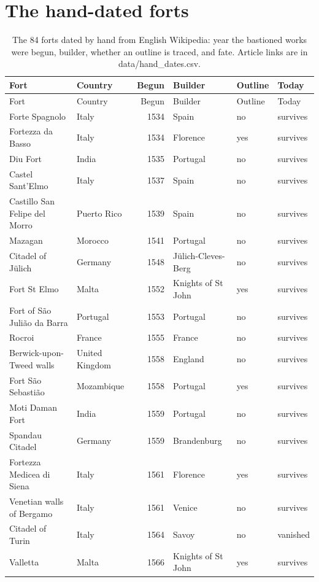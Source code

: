 \documentclass[11pt,a4paper]{article}
\begin{document}
\section{The hand-dated forts}
{\footnotesize\setlength{\tabcolsep}{4pt}\begin{longtable}{p{4.6cm}p{3.2cm}rp{3.2cm}ll}\caption{The 84 forts dated by hand from English Wikipedia: year the bastioned works were begun, builder, whether an outline is traced, and fate. Article links are in data/hand\_dates.csv.}\label{tab:hand}\\\toprule Fort & Country & Begun & Builder & Outline & Today\\\midrule\endfirsthead\toprule Fort & Country & Begun & Builder & Outline & Today\\\midrule\endhead
Forte Spagnolo & Italy & 1534 & Spain & no & survives\\
Fortezza da Basso & Italy & 1534 & Florence & yes & survives\\
Diu Fort & India & 1535 & Portugal & no & survives\\
Castel Sant'Elmo & Italy & 1537 & Spain & no & survives\\
Castillo San Felipe del Morro & Puerto Rico & 1539 & Spain & no & survives\\
Mazagan & Morocco & 1541 & Portugal & no & survives\\
Citadel of Jülich & Germany & 1548 & Jülich-Cleves-Berg & no & survives\\
Fort St Elmo & Malta & 1552 & Knights of St John & yes & survives\\
Fort of São Julião da Barra & Portugal & 1553 & Portugal & no & survives\\
Rocroi & France & 1555 & France & no & survives\\
Berwick-upon-Tweed walls & United Kingdom & 1558 & England & no & survives\\
Fort São Sebastião & Mozambique & 1558 & Portugal & yes & survives\\
Moti Daman Fort & India & 1559 & Portugal & no & survives\\
Spandau Citadel & Germany & 1559 & Brandenburg & no & survives\\
Fortezza Medicea di Siena & Italy & 1561 & Florence & yes & survives\\
Venetian walls of Bergamo & Italy & 1561 & Venice & no & survives\\
Citadel of Turin & Italy & 1564 & Savoy & no & vanished\\
Valletta & Malta & 1566 & Knights of St John & yes & survives\\

\end{longtable}}
\end{document}
